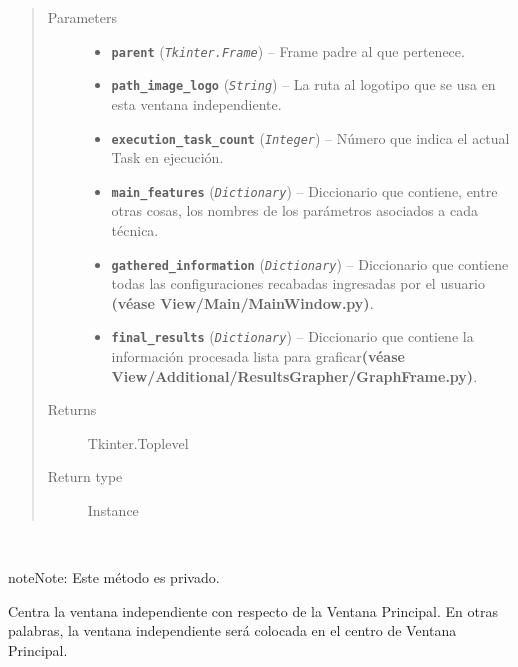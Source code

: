 \documentclass[class=report, crop=false]{standalone}
\begin{document}
\begin{fulllineitems}
\begin{quote}\begin{description}
\item[{Parameters}] \leavevmode\begin{itemize}
\item \textbf{\texttt{parent}} (\emph{\texttt{Tkinter.Frame}}) -- Frame padre al que pertenece.
\item \textbf{\texttt{path\_image\_logo}} (\emph{\texttt{String}}) -- La ruta al logotipo que se usa en esta ventana independiente.
\item \textbf{\texttt{execution\_task\_count}} (\emph{\texttt{Integer}}) -- Número que indica el actual Task en ejecución.
\item \textbf{\texttt{main\_features}} (\emph{\texttt{Dictionary}}) -- Diccionario que contiene, entre otras cosas, los nombres de los parámetros asociados a cada técnica.
\item \textbf{\texttt{gathered\_information}} (\emph{\texttt{Dictionary}}) -- Diccionario que contiene todas las configuraciones recabadas ingresadas por el usuario \textbf{(véase View/Main/MainWindow.py)}.
\item \textbf{\texttt{final\_results}} (\emph{\texttt{Dictionary}}) -- Diccionario que contiene la información procesada lista para graficar\textbf{(véase View/Additional/ResultsGrapher/GraphFrame.py)}.
\end{itemize}

\item[{Returns}] \leavevmode
Tkinter.Toplevel
\item[{Return type}] \leavevmode
Instance
\end{description}\end{quote}


\begin{fulllineitems}

~

\begin{notice}{note}{Note:}
Este método es privado.
\end{notice}

Centra la ventana independiente con respecto de la 
Ventana Principal.\break
En otras palabras, la ventana independiente será 
colocada en el centro de Ventana Principal.

\end{fulllineitems}


\end{fulllineitems}
\end{document}

